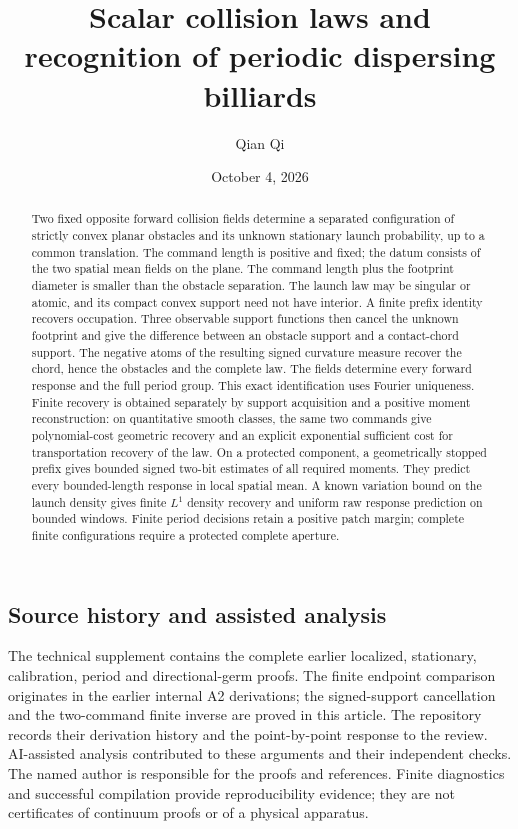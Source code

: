 \documentclass[11pt]{amsart}
\title[Scalar collision laws]{Scalar collision laws and recognition of periodic dispersing billiards}
\author{Qian Qi}
\date{October 4, 2026}
\begin{document}
\raggedbottom
\begin{abstract}
Two fixed opposite forward collision fields determine a separated
configuration of strictly convex planar obstacles and its unknown
stationary launch probability, up to a common translation. The command
length is positive and fixed; the datum consists of the two spatial
mean fields on the plane. The command length plus the footprint
diameter is smaller than the obstacle separation.
The launch law may be singular or atomic,
and its compact convex support need not have interior. A finite prefix
identity recovers occupation. Three observable support functions then
cancel the unknown footprint and give the difference between an
obstacle support and a contact-chord support. The negative atoms of
the resulting signed curvature measure recover the chord, hence the
obstacles and the complete law. The fields determine every forward
response and the full period group. This exact identification uses
Fourier uniqueness. Finite recovery is obtained separately by support
acquisition and a positive moment reconstruction: on quantitative smooth
classes, the same two commands give polynomial-cost geometric recovery
and an explicit exponential sufficient cost for transportation recovery
of the law. On a protected component, a geometrically stopped prefix
gives bounded signed two-bit estimates of all required moments. They predict every bounded-length response in local spatial
mean. A known variation bound on the launch density gives finite
\(L^1\) density recovery and uniform raw response prediction on bounded
windows. Finite period decisions retain a positive patch margin;
complete finite configurations require a protected complete aperture.
\end{abstract}
\maketitle
\enlargethispage{2pt}






\appendix


\subsection*{Source history and assisted analysis}
The technical supplement contains the complete earlier localized,
stationary, calibration, period and directional-germ proofs. The
finite endpoint comparison originates in the earlier internal A2
derivations; the signed-support cancellation and the two-command
finite inverse are proved in this article. The repository records
their derivation history and the point-by-point response to the review.
AI-assisted analysis contributed to these arguments and their
independent checks. The named author is responsible for the proofs
and references. Finite diagnostics and successful compilation provide
reproducibility evidence; they are not certificates of continuum
proofs or of a physical apparatus.

\end{document}
